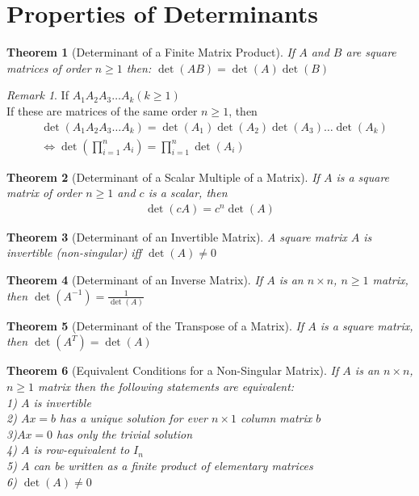 \documentclass{jhwhw}
\newtheorem{theorem}{Theorem}
\theoremstyle{definition}
\theoremstyle{remark}
\newtheorem*{remark}{Remark}
\theoremstyle{example}
\begin{document}
\section{Properties of Determinants}
\begin{theorem}[Determinant of a Finite Matrix Product] If \(A\) and \(B\) are square matrices of order \(n \geq 1\) then: \(\det(AB) = \det(A) \det(B)\) \end{theorem}
\begin{remark} If \(A_1 A_2 A_3 \ldots A_k (k \geq 1) \)\\
If these are matrices of the same order \(n \geq 1\), then
\begin{align*} & \det (A_1 A_2 A_3 \ldots A_k) = \det (A_1) \det (A_2) \det (A_3) \ldots \det(A_k)\\
 & \Leftrightarrow \det (\prod_{i=1}^{n} A_i) = \prod_{i=1}^{n} \det(A_i) \end{align*}\end{remark}
\begin{theorem}[Determinant of a Scalar Multiple of a Matrix] If \(A\) is a square matrix of order \(n \geq 1\) and \(c\) is a scalar, then
\begin{align*} \det(cA) = c^n \det(A) \end{align*} \end{theorem}
\begin{theorem}[Determinant of an Invertible Matrix] A square matrix \(A\) is invertible (non-singular) iff \(\det(A) \neq 0\) \end{theorem}
\begin{theorem}[Determinant of an Inverse Matrix] If \(A\) is an \(n \times n\), \(n \geq 1\) matrix, then \(\det (A^{-1}) = \frac{1}{\det(A)}\) \end{theorem}
\begin{theorem}[Determinant of the Transpose of a Matrix] If \(A\) is a square matrix, then \(\det(A^T) = \det(A)\) \end{theorem}
\begin{theorem}[Equivalent Conditions for a Non-Singular Matrix] If \(A\) is an \(n \times n\), \(n \geq 1\) matrix then the following statements are equivalent:\\
1) \(A\) is invertible\\
2) \(Ax = b\) has a unique solution for ever \(n \times 1\) column matrix \(b\)\\
3)\(Ax = 0\) has only the trivial solution\\
4) \(A\) is row-equivalent to \(I_n\)\\
5) \(A\) can be written as a finite product of elementary matrices\\
6) \(\det(A) \neq 0\) \end{theorem}
\end{document}
